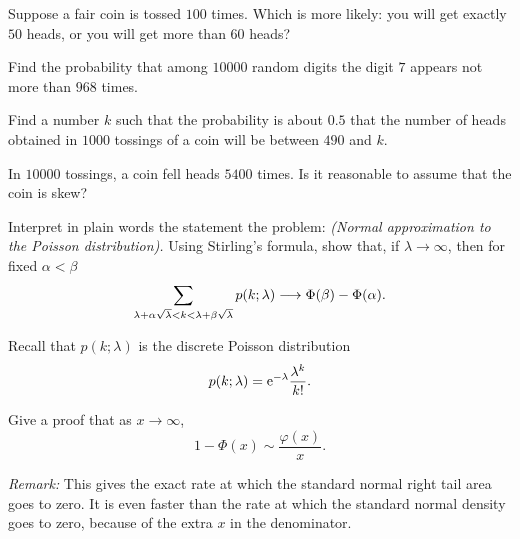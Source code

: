 \begin{problem}
  Suppose a fair coin is tossed \(100\) times. Which is more likely: you
  will get exactly \(50\) heads, or you will get more than \(60\) heads?
\end{problem}
\begin{solution}

\end{solution}

\begin{problem}[Handout 14, \# 11]
  Find the probability that among \(10000\) random digits the digit \(7\)
  appears not more than \(968\) times.
\end{problem}
\begin{solution}

\end{solution}

\begin{problem}[Handout 14, \# 12]
  Find a number \(k\) such that the probability is about \(0.5\) that the
  number of heads obtained in \(1000\) tossings of a coin will be between
  \(490\) and \(k\).
\end{problem}
\begin{solution}

\end{solution}

\begin{problem}[Handout 14, \# 13]
  In \(10000\) tossings, a coin fell heads \(5400\) times. Is it reasonable
  to assume that the coin is skew?
\end{problem}
\begin{solution}

\end{solution}

\begin{problem}[Handout 14, \# 14]
  Interpret in plain words the statement the problem: \emph{(Normal
    approximation to the Poisson distribution).} Using Stirling's formula,
  show that, if \(\lambda\to\infty\), then for fixed \(\alpha<\beta\)
  \[
    \sum_{\lambda+\alpha\sqrt{\lambda}<k<\lambda+\beta\sqrt{\lambda}}p(k;\lambda)
    \longrightarrow \Phi(\beta)-\Phi(\alpha).
  \]
\end{problem}
\begin{solution}
  Recall that \(p(k;\lambda)\) is the discrete Poisson distribution
  \[
    p(k;\lambda)=\mathrm{e}^{-\lambda}\frac{\lambda^k}{k!}.
  \]
\end{solution}

\begin{problem}[Handout 14, \# 15]
  Give a proof that as \(x\to\infty\),
  \[
    1-\Phi(x)\sim\frac{\varphi(x)}{x}.
  \]

  \noindent \emph{Remark:} This gives the exact rate at which the standard
  normal right tail area goes to zero. It is even faster than the rate at
  which the standard normal density goes to zero, because of the extra
  \(x\) in the denominator.
\end{problem}
\begin{solution}

\end{solution}

